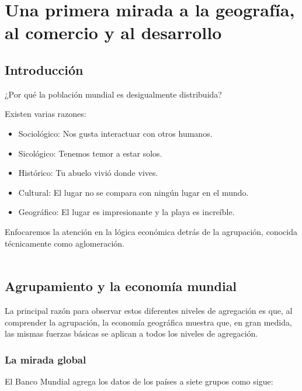 \chapter{Una primera mirada a la geografía, al comercio y al desarrollo}

\section{Introducción}

    \begin{center}
	¿Por qué la población mundial es desigualmente distribuida?
    \end{center}

    Existen varias razones:\\

    \begin{itemize}
	\item Sociológico: Nos gusta interactuar con otros humanos.
	\item Sicológico: Tenemos temor a estar solos.
	\item Histórico: Tu abuelo vivió donde vives. 
	\item Cultural: El lugar no se compara con ningún lugar en el mundo.
	\item Geográfico: El lugar es impresionante y la playa es increíble.\\
    \end{itemize}

    Enfocaremos la atención en la lógica económica detrás de la agrupación, conocida técnicamente como aglomeración.\\\\

\section{Agrupamiento y la economía mundial}
    La principal razón para observar estos diferentes niveles de agregación es que, al comprender la agrupación, la economía geográfica muestra que, en gran medida, las mismas fuerzas básicas se aplican a todos los niveles de agregación.

    \subsection{La mirada global}
    El Banco Mundial agrega los datos de los países a siete grupos como sigue:

